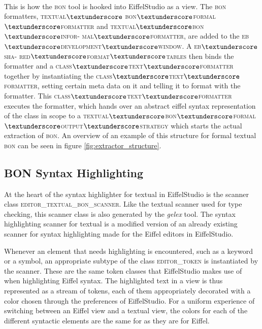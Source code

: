 \paragraph{}
This is how the \textsc{bon} tool is hooked into EiffelStudio as a view. The \textsc{bon} formatters, \textsc{textual$\textunderscore$ bon$\textunderscore$formal$\textunderscore$formatter} and \textsc{textual$\textunderscore$bon$\textunderscore$infor- mal$\textunderscore$formatter}, are added to the \textsc{eb$\textunderscore$development$\textunderscore$window}. A \textsc{eb$\textunderscore$sha- red$\textunderscore$format$\textunderscore$tables} then binds the formatter and a \textsc{class$\textunderscore$text$\textunderscore$formatter} together by instantiating the \textsc{class$\textunderscore$text$\textunderscore$formatter}, setting certain meta data on it and telling it to format with the formatter. This \textsc{class$\textunderscore$text$\textunderscore$formatter} executes the formatter, which hands over an abstract eiffel syntax representation of the class in scope to a \textsc{textual$\textunderscore$bon$\textunderscore$formal$\textunderscore$output$\textunderscore$strategy} which starts the actual extraction of \textsc{bon}. An overview of  an example of this structure for formal textual \textsc{bon} can be seen in figure \ref{fig:extractor_structure}.

\subsection{BON Syntax Highlighting}
At the heart of the syntax highlighter for textual \bon{} in EiffelStudio is the scanner class \textsc{editor\_textual\_bon\_scanner}. Like the textual \bon{} scanner used for type checking, this scanner class is also generated by the \textit{gelex} tool. The syntax highlighting scanner for textual \bon{} is a modified version of an already existing scanner for syntax highlighting made for the Eiffel editors in EiffelStudio. 

Whenever an element that needs highlighting is encountered, such as a keyword or a symbol, an appropriate subtype of the class \textsc{editor\_token} is instantiated by the scanner. These are the same token classes that EiffelStudio makes use of when highlighting Eiffel syntax. The highlighted text in a view is thus represented as a stream of tokens, each of them appropriately decorated with a color chosen through the preferences of EiffelStudio. For a uniform experience of switching between an Eiffel view and a textual \bon{} view, the colors for each of the different syntactic elements are the same for \bon{} as they are for Eiffel. 